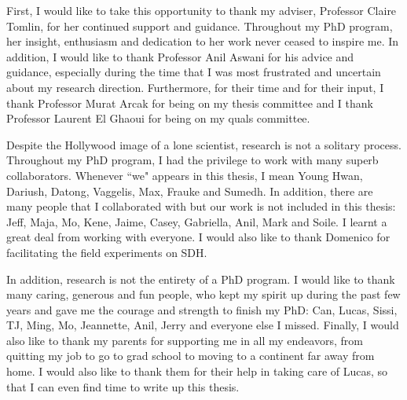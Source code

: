 \documentclass[12pt, oneside, final]{lib/ucthesis}
\begin{document}
\begin{optionalFrontMatter}
%
\end{optionalFrontMatter}

\tableofcontents

\begin{acknowledgements}
\thispagestyle{plain}

First, I would like to take this opportunity to thank my adviser, Professor Claire Tomlin, for her continued support and guidance. Throughout my PhD program, her insight, enthusiasm and dedication to her work never ceased to inspire me.
In addition, I would like to thank Professor Anil Aswani for his advice and guidance, especially during the time that I was most frustrated and uncertain about my research direction.
Furthermore, for their time and for their input, I thank Professor Murat Arcak for being on my thesis committee and I thank Professor Laurent El Ghaoui for being on my quals committee.

Despite the Hollywood image of a lone scientist, research is not a solitary process. 
Throughout my PhD program, I had the privilege to work with many superb collaborators. Whenever ``we" appears in this thesis, I mean Young Hwan, Dariush, Datong, Vaggelis, Max, Frauke and Sumedh. 
In addition, there are many people that I collaborated with but our work is not included in this thesis: Jeff, Maja, Mo, Kene, Jaime, Casey, Gabriella, Anil, Mark and Soile. 
I learnt a great deal from working with everyone.
I would also like to thank Domenico for facilitating the field experiments on SDH.

In addition, research is not the entirety of a PhD program. I would like to thank many caring, generous and fun people, who kept my spirit up during the past few years and gave me the courage and strength to finish my PhD: Can, Lucas, Sissi, TJ, Ming, Mo, Jeannette, Anil, Jerry and everyone else I missed.
Finally, I would also like to thank my parents for supporting me in all my endeavors, from quitting my job to go to grad school to moving to a continent far away from home. I would also like to thank them for their help in taking care of Lucas, so that I can even find time to write up this thesis.


\end{acknowledgements}
\end{document}
